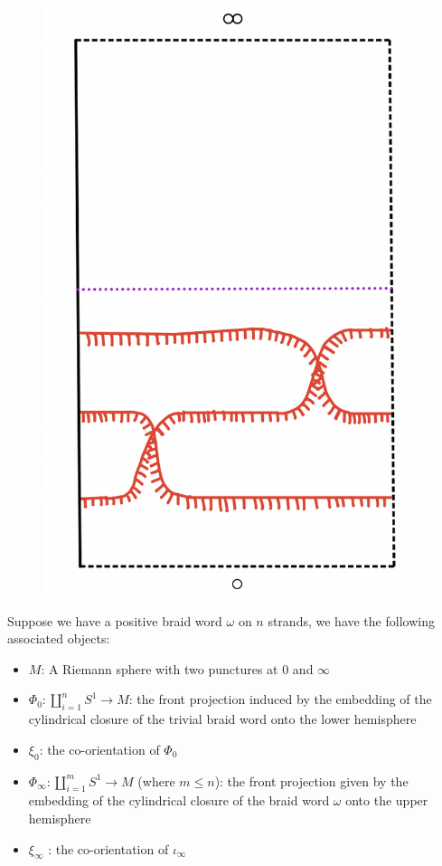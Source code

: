 \begin{figure}[H] 
    \centering
    \includegraphics[scale = 0.55]{diagrams/natural_alternating_diagrams/4-2.png} 
    \caption{}
    \label{fig:your-label}
\end{figure}

Suppose we have a positive braid word $\omega$ on $n$ strands, we have the following associated objects: 
\begin{itemize}
\item $M$: A Riemann sphere with two punctures at $0$ and $\infty$

\item $\Phi_0 : \coprod_{i=1}^{n} S^1 \rightarrow  M$: the front projection induced by the embedding of the cylindrical closure of the trivial braid word onto the lower hemisphere

\item $\xi_0$: the co-orientation of $\Phi_0$

\item $\Phi_\infty : \coprod_{i=1}^{m} S^1 \rightarrow M$ (where $m \leq n$): the front projection given by the embedding of the cylindrical closure of the braid word $\omega$ onto the upper hemisphere

\item $\xi_\infty$ : the co-orientation of $\iota_\infty$
\end{itemize}


